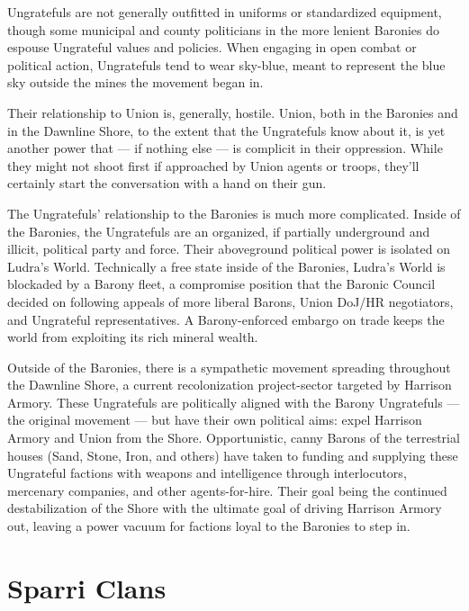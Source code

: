 Ungratefuls are not generally outfitted in uniforms or standardized equipment, though some  
municipal and county politicians in the more lenient Baronies do espouse Ungrateful values and  
policies. When engaging in open combat or political action, Ungratefuls tend to wear sky-blue,  
meant to represent the blue sky outside the mines the movement began in.
 

Their relationship to Union is, generally, hostile. Union, both in the Baronies and in the Dawnline  
Shore, to the extent that the Ungratefuls know about it, is yet another power that — if nothing  
else — is complicit in their oppression. While they might not shoot first if approached by Union  
agents or troops, they’ll certainly start the conversation with a hand on their gun.  
 

The Ungratefuls’ relationship to the Baronies is much more complicated. Inside of the Baronies,  
the Ungratefuls are an organized, if partially underground and illicit, political party and force.  
Their aboveground political power is isolated on Ludra’s World. Technically a free state inside of  
the Baronies, Ludra’s World is blockaded by a Barony fleet, a compromise position that the  
Baronic Council decided on following appeals of more liberal Barons, Union DoJ/HR negotiators,  
and Ungrateful representatives. A Barony-enforced embargo on trade keeps the world from  
exploiting its rich mineral wealth. 
 

Outside of the Baronies, there is a sympathetic movement spreading throughout the Dawnline  
Shore, a current recolonization project-sector targeted by Harrison Armory. These Ungratefuls  
are politically aligned with the Barony Ungratefuls — the original movement — but have their own  
political aims: expel Harrison Armory and Union from the Shore. Opportunistic, canny Barons of  
the terrestrial houses (Sand, Stone, Iron, and others) have taken to funding and supplying these  
Ungrateful factions with weapons and intelligence through interlocutors, mercenary companies,  
and other agents-for-hire. Their goal being the continued destabilization of the Shore with the  
ultimate goal of driving Harrison Armory out, leaving a power vacuum for factions loyal to the  
Baronies to step in. 
 

                                                                                                         
\section{Sparri Clans}

